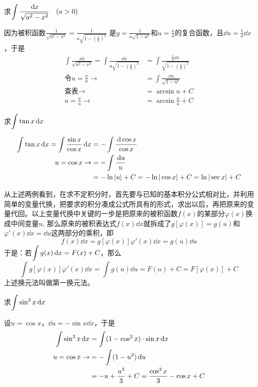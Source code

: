 \begin{example}
    求$\displaystyle\int \dfrac{\,{\rm d} x}{\sqrt{a^2-x^2}}\quad (a>0)$
\end{example}

\begin{solution}
    因为被积函数$\frac{1}{\sqrt{a^2-x^2}}=\frac{1}{a\sqrt{1-\left(\frac{x}{a}\right)^2}}$
是$y=\frac{1}{a\sqrt{1-u^2}}$和$u=\frac{x}{a}$的复合函数，且$\dd u=\frac{1}{a}\dd x$，于是
\[\begin{split}
    \int \frac{\dd x}{\sqrt{a^2-x^2}}=\int \frac{\dd x}{a\sqrt{1-\left(\frac{x}{a}\right)^2}}&=\int \frac{\frac{1}{a}\dd x}{\sqrt{1-\left(\frac{x}{a}\right)^2}}\\
    \text{令}u=\frac{x}{a}\to &= \int \frac{\dd u}{\sqrt{1-u^2}}\\
    \text{查表}\to &=\arcsin u+C\\
    u=\frac{x}{a} \to &=\arcsin \frac{x}{a}+C
\end{split}\]
\end{solution}

\begin{example}
    求$\displaystyle\int \tan x\,{\rm d} x$
\end{example}


\begin{solution}
\[\begin{split}
    \displaystyle\int \tan x\,{\rm d} x=\displaystyle\int  \dfrac{\sin x}{\cos x}\,{\rm d} x&=-\int \dfrac{\,{\rm d} \cos x}{\cos x}\\
    u=\cos x\to &=-\int \dfrac{\,{\rm d} u}{u}\\
    &=-\ln|u|+C=-\ln |\cos x|+C=\ln |\sec x|+C
\end{split}\]
\end{solution}

从上述两例看到，在求不定积分时，首先要与已知的基本积分公式相对比，并利用简单的变量代换，把要求的积分凑成公式所具有的形式，求出以后，再把原来的变量代回。以上变量代换中关键的一步是把原来的被积函数$f(x)$的某部分$\varphi(x)$换成中间变量$u$, 那么原来的被积表达式$f(x)\dd x$就拆成了$g[\varphi(x)]=g(u)$和$\varphi'(x)\dd x=\dd u$这两部分的乘积，即
\[f (x) \dd x=g [\varphi (x) ] \varphi' (x) \dd x=g (u) \dd u\]
于是：若$\displaystyle\int g(x)\,{\rm d} x=F(x)+C$，那么
\[\int g[\varphi(x)]\varphi'(x)\dd x=\int g(u)\dd u=F(u)+C=F[\varphi(x)]+C\]
上述换元法叫做第一换元法。

\begin{example}
求$\displaystyle\int \sin^{3}x\,{\rm d} x$
\end{example}

\begin{solution}
设$u=\cos x$，$\dd u=-\sin x\dd x$，于是
\[\begin{split}
    \displaystyle\int \sin^{3}x\,{\rm d} x&=\int (1-\cos^2 x)\cdot \sin x\,{\rm d} x\\
  u=\cos x\to  &=-\int (1-u^2)\,{\rm d} u\\
  &=-u+\dfrac{u^3}{3}+C=\dfrac{\cos^3 x}{3}-\cos x+C
\end{split}\]
\end{solution}

